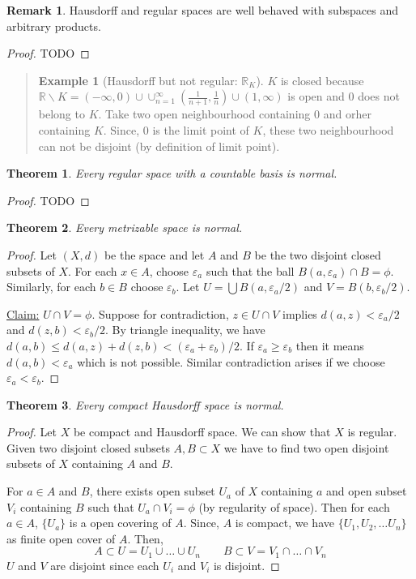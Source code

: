 \documentclass[12pt,reqno]{amsart}
\theoremstyle{plain}
\newtheorem{thm}{Theorem}
\theoremstyle{definition}
\newtheorem{eg}{Example}
\newtheorem{rem}{Remark}
\newcommand{\bb}[1]{\mathbb{#1}}
\begin{document}
\begin{rem}
    Hausdorff and regular spaces are well behaved with subspaces and arbitrary products.
\end{rem}
\begin{proof}
    TODO
\end{proof}
\begin{quotation}
    \begin{eg}[Hausdorff but not regular: $\bb R_K$]
    $K$ is closed because $\bb R\backslash K = (-\infty,0) \cup \cup_{n=1}^{\infty}(\frac{1}{n+1},\frac{1}{n}) \cup (1,\infty)$ is open and $0$ does not belong to $K$. Take two open neighbourhood containing $0$ and orher containing $K$. Since, $0$ is the limit point of $K$, these two neighbourhood can not be disjoint (by definition of limit point).
    \end{eg}
\end{quotation}
\begin{thm}
    Every regular space with a countable basis is normal.
\end{thm}
\begin{proof}
    TODO
\end{proof}
\begin{thm}
    Every metrizable space is normal.
\end{thm}
\begin{proof}
    Let $(X,d)$ be the space and let $A$ and $B$ be the two disjoint closed subsets of $X$. For each $x \in A$, choose $\varepsilon_a$ such that the ball $B(a,\varepsilon_a) \cap B = \phi$. Similarly, for each $b \in B$ choose $\varepsilon_b$. Let $U = \bigcup B(a,\varepsilon_a/2)$ and $V = B(b,\varepsilon_b/2)$.

    \noindent \underline{Claim:} $U \cap V = \phi$. Suppose for contradiction, $z \in U \cap V$ implies $d(a,z) < \varepsilon_a/2$ and $d(z,b) < \varepsilon_b/2$. By triangle inequality, we have $d(a,b) \leq d(a,z) + d(z,b) < (\varepsilon_a + \varepsilon_b)/2$. If $\varepsilon_a \geq \varepsilon_b$ then it means $d(a,b) < \varepsilon_a$ which is not possible. Similar contradiction arises if we choose $\varepsilon_a < \varepsilon_b$.
\end{proof}
\begin{thm}
    Every compact Hausdorff space is normal.
\end{thm}
\begin{proof}
    Let $X$ be compact and Hausdorff space. We can show that $X$ is regular. Given two disjoint closed subsets $A,B \subset X$ we have to find two open disjoint subsets of $X$ containing $A$ and $B$.

    \noindent For $a\in A$ and $B$, there exists open subset $U_a$ of $X$ containing $a$ and open subset $V_i$ containing $B$ such that $U_a \cap V_i = \phi$ (by regularity of space). Then for each $a \in A$, $\{U_a\}$ is a open covering of $A$. Since, $A$ is compact, we have $\{U_1, U_2, \dots U_n\}$ as finite open cover of $A$. Then,
    $$ A \subset U = U_1 \cup \dots \cup U_n \qquad B \subset V = V_1 \cap \dots \cap V_n$$
    $U$ and $V$ are disjoint since each $U_i$ and $V_i$ is disjoint.    
\end{proof}
\end{document}
